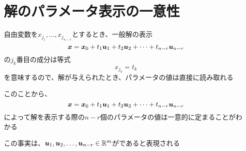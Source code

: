 \documentclass[../../../topic_linear-algebra]{subfiles}
\begin{document}
\sectionline
\section{解のパラメータ表示の一意性}

自由変数を$x_{j_1}, \dots, x_{j_{n-r}}$とするとき、一般解の表示
\begin{equation*}
  \vb*{x} = \vb*{x}_0 + t_1\vb*{u}_1 + t_2\vb*{u}_2 + \cdots + t_{n-r}\vb*{u}_{n-r}
\end{equation*}
の$j_k$番目の成分は等式
\begin{equation*}
  x_{j_k} = t_k
\end{equation*}
を意味するので、解が与えられたとき、パラメータの値は直接に読み取れる

\br

このことから、
\begin{equation*}
  \vb*{x} = \vb*{x}_0 + t_1\vb*{u}_1 + t_2\vb*{u}_2 + \cdots + t_{n-r}\vb*{u}_{n-r}
\end{equation*}
によって解を表示する際の$n-r$個のパラメータの値は一意的に定まることがわかる

この事実は、$\vb*{u}_1, \vb*{u}_2, \dots, \vb*{u}_{n-r} \in \mathbb{R}^m$がであると表現される
\end{document}

